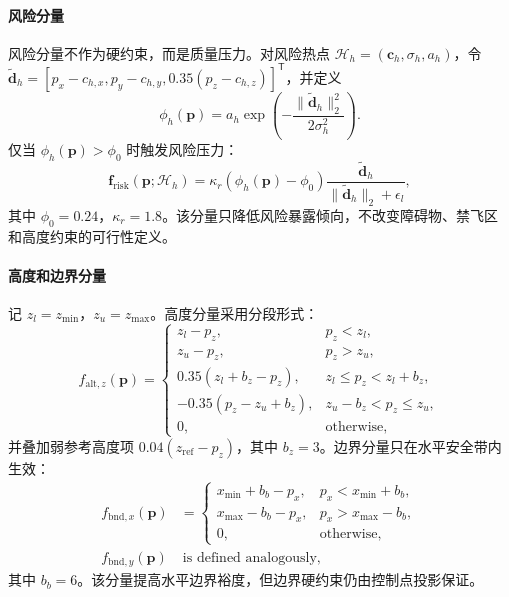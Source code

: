 \paragraph{风险分量}
风险分量不作为硬约束，而是质量压力。对风险热点 $\mathcal H_h=(\mathbf c_h,\sigma_h,a_h)$，令 $\widetilde{\mathbf d}_h=[p_x-c_{h,x},p_y-c_{h,y},0.35(p_z-c_{h,z})]^\mathsf T$，并定义
\begin{equation}
    \phi_h(\mathbf p)=
    a_h\exp\left(-\frac{\|\widetilde{\mathbf d}_h\|_2^2}{2\sigma_h^2}\right).
    \label{eq:risk-hotspot}
\end{equation}
仅当 $\phi_h(\mathbf p)>\phi_0$ 时触发风险压力：
\begin{equation}
    \mathbf f_{\mathrm{risk}}(\mathbf p;\mathcal H_h)=
    \kappa_r(\phi_h(\mathbf p)-\phi_0)
    \frac{\widetilde{\mathbf d}_h}{\|\widetilde{\mathbf d}_h\|_2+\epsilon_l},
    \label{eq:risk-pressure}
\end{equation}
其中 $\phi_0=0.24$，$\kappa_r=1.8$。该分量只降低风险暴露倾向，不改变障碍物、禁飞区和高度约束的可行性定义。

\paragraph{高度和边界分量}
记 $z_l=z_{\min}$，$z_u=z_{\max}$。高度分量采用分段形式：
\begin{equation}
f_{\mathrm{alt},z}(\mathbf p)=
\begin{cases}
z_l-p_z, & p_z<z_l,\\
z_u-p_z, & p_z>z_u,\\
0.35(z_l+b_z-p_z), & z_l\leq p_z<z_l+b_z,\\
-0.35(p_z-z_u+b_z), & z_u-b_z<p_z\leq z_u,\\
0, & \mathrm{otherwise},
\end{cases}
\label{eq:altitude-pressure}
\end{equation}
并叠加弱参考高度项 $0.04(z_{\mathrm{ref}}-p_z)$，其中 $b_z=3$。边界分量只在水平安全带内生效：
\begin{equation}
\begin{aligned}
f_{\mathrm{bnd},x}(\mathbf p)&=
\begin{cases}
x_{\min}+b_b-p_x, & p_x<x_{\min}+b_b,\\
x_{\max}-b_b-p_x, & p_x>x_{\max}-b_b,\\
0, & \mathrm{otherwise},
\end{cases}\\
f_{\mathrm{bnd},y}(\mathbf p)&\ \text{is defined analogously},
\end{aligned}
\label{eq:boundary-pressure}
\end{equation}
其中 $b_b=6$。该分量提高水平边界裕度，但边界硬约束仍由控制点投影保证。

